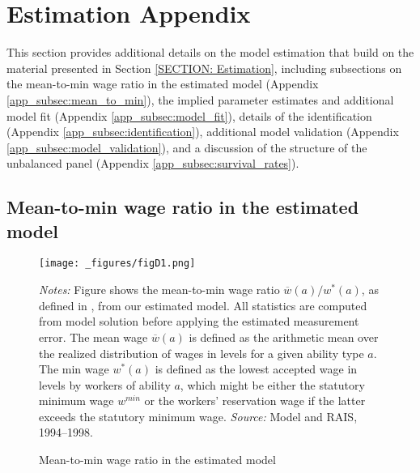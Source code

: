 
\section{Estimation Appendix\label{APPENDIX: Estimation}}

This section provides additional details on the model estimation that build on the material presented in Section \ref{SECTION: Estimation}, including subsections on %
%
the mean-to-min wage ratio in the estimated model (Appendix \ref{app_subsec:mean_to_min}), %
%
the implied parameter estimates and additional model fit (Appendix \ref{app_subsec:model_fit}), %
%
details of the identification (Appendix \ref{app_subsec:identification}), %
%
additional model validation (Appendix \ref{app_subsec:model_validation}), %
%
and a discussion of the structure of the unbalanced panel (Appendix \ref{app_subsec:survival_rates}).




\clearpage
\subsection{Mean-to-min wage ratio in the estimated model\label{app_subsec:mean_to_min}}

\begin{figure}[!htb]
  \centering
  \caption{Mean-to-min wage ratio in the estimated model\label{fig:mean_to_min}}
  \prefigvspace
  \texttt{[image: \_figures/figD1.png]} %
  \\
  \postfigvspace
  \begin{minipage}[t]{1\columnwidth}%
    \begin{spacing}{0.75}
      \emph{\scriptsize{}Notes: }{\scriptsize{}Figure shows the mean-to-min wage ratio $\overline{w}(a)/w^{\ast}(a)$, as defined in , from our estimated model. All statistics are computed from model solution before applying the estimated measurement error. The mean wage $\overline{w}(a)$ is defined as the arithmetic mean over the realized distribution of wages in levels for a given ability type $a$. The min wage $w^{\ast}(a)$ is defined as the lowest accepted wage in levels by workers of ability $a$, which might be either the statutory minimum wage $w^{min}$ or the workers' reservation wage if the latter exceeds the statutory minimum wage. %
      \emph{\scriptsize{}Source: } Model and RAIS, 1994--1998.}
    \end{spacing}
  \end{minipage}
\end{figure}




